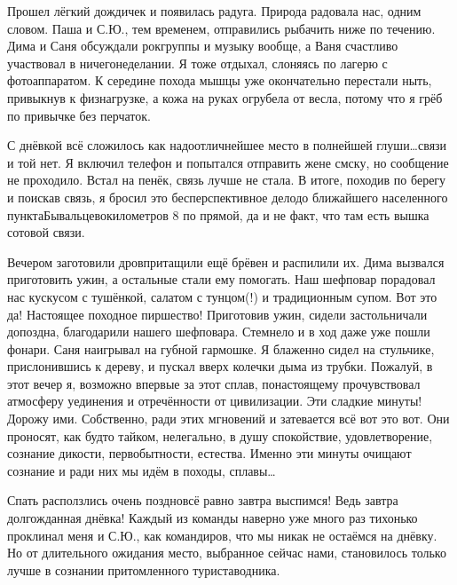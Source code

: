 Прошел лёгкий дождичек и появилась радуга. Природа радовала нас, одним словом. Паша и С.Ю., тем временем, отправились рыбачить ниже по течению. Дима и Саня обсуждали рок\sdash группы и музыку вообще, а Ваня счастливо участвовал в ничегонеделании. Я тоже отдыхал, слоняясь по лагерю с фотоаппаратом. К середине похода мышцы уже окончательно перестали ныть, привыкнув к физнагрузке, а кожа на руках огрубела от весла, потому что я грёб по привычке без перчаток. 

С днёвкой всё сложилось как надо\mdash отличнейшее место в полнейшей глуши\ldots  связи и той нет. Я включил телефон и попытался отправить жене смску, но сообщение не проходило. Встал на пенёк, связь лучше не стала. В итоге, походив по берегу и поискав связь, я бросил это бесперспективное дело\mdash до ближайшего населенного пункта\mdash Бывальцево\mdash  километров 8 по прямой, да и не факт, что там есть вышка сотовой связи.

Вечером заготовили дров\mdash притащили ещё брёвен и распилили их. Дима вызвался приготовить ужин, а остальные стали ему помогать. Наш шеф\sdash повар порадовал нас кус\sdash кусом с тушёнкой, салатом с тунцом(!) и традиционным супом. Вот это да! Настоящее походное пиршество! Приготовив ужин, сидели застольничали допоздна, благодарили нашего шеф\sdash повара. Стемнело и в ход даже уже пошли фонари. Саня наигрывал на губной гармошке. Я блаженно сидел на стульчике, прислонившись к дереву, и пускал вверх колечки дыма из трубки. Пожалуй, в этот вечер я, возможно впервые за этот сплав, по\sdash настоящему прочувствовал атмосферу уединения и отречённости от цивилизации. Эти сладкие минуты! Дорожу ими. Собственно, ради этих мгновений и затевается всё вот это вот. Они проносят, как будто тайком, нелегально, в душу спокойствие, удовлетворение, сознание дикости, первобытности, естества. Именно эти минуты очищают сознание и ради них мы идём в походы, сплавы\ldots 

Спать расползлись очень поздно\mdash всё равно завтра выспимся! Ведь завтра долгожданная днёвка! Каждый из команды наверно уже много раз тихонько проклинал меня и С.Ю., как командиров, что мы никак не остаёмся на днёвку. Но от длительного ожидания место, выбранное сейчас нами, становилось только лучше в сознании притомленного туриста\sdash водника.

\begin{center}
\end{center}
